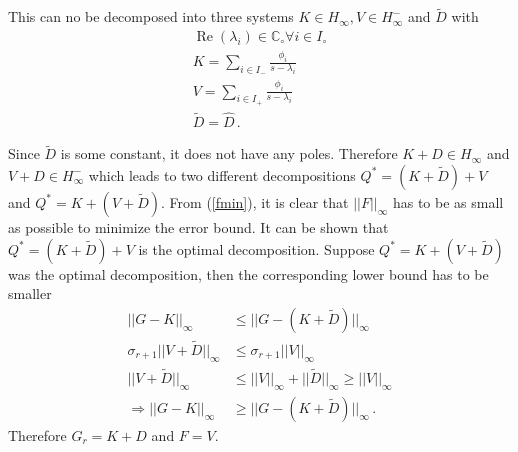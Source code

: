 This can no be decomposed into three systems \(K \in H_\infty, V \in H_{\infty}^-\) and \(\tilde{D}\) with
\begin{gather}
\operatorname{Re}(\lambda_i) \in \mathbb{C}_{\circ} \forall i \in I_{\circ} \\
K = \sum_{i \in I_-} \frac{\phi_i}{s-\lambda_i} \\
V = \sum_{i \in I_+} \frac{\phi_i}{s-\lambda_i} \\
\tilde{D} = \hat{D} \,.
\end{gather}

Since \(\tilde{D}\) is some constant, it does not have any poles.
Therefore \(K + D \in H_\infty\) and \(V + D \in H_{\infty}^-\) which leads to two different decompositions \(Q^{*} = (K + \tilde{D}) + V \) and \(Q^{*} = K + (V + \tilde{D})\).
From (\ref{fmin}), it is clear that \(||F||_{\infty}\) has to be as small as possible to minimize the error bound.
It can be shown that \(Q^{*} = (K + \tilde{D}) + V \) is the optimal decomposition.
Suppose \(Q^{*} = K + (V + \tilde{D})\) was the optimal decomposition, then the corresponding lower bound has to be smaller
\begin{align}
||G-K||_{\infty} &\leq ||G-(K+\tilde{D})||_{\infty} \\
\sigma_{r+1}||V + \tilde{D}||_{\infty} &\leq \sigma_{r+1}||V||_{\infty} \\
||V + \tilde{D}||_{\infty} &\leq ||V||_{\infty} + ||\tilde{D}||_{\infty} \geq ||V||_{\infty} \\
\Rightarrow ||G-K||_{\infty} &\geq ||G-(K+\tilde{D})||_{\infty} \,.
\end{align}
Therefore \(G_r = K + D\) and \(F = V\).

